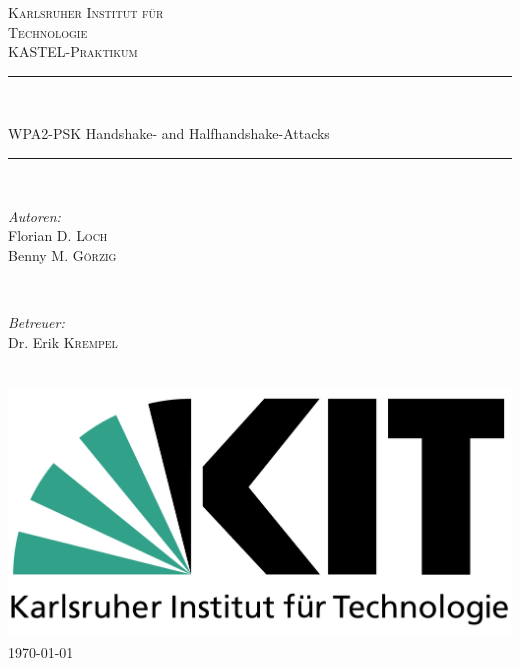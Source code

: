 \begin{titlepage}

\newcommand{\HRule}{\rule{\linewidth}{0.5mm}}

\center

\textsc{\LARGE Karlsruher Institut für }\\[0.5cm]
\textsc{\LARGE Technologie} \\[1.5cm]
\textsc{\Large KASTEL-Praktikum}\\[0.5cm]

\HRule \\[0.4cm]
\begin{huge}
	WPA2-PSK Handshake- and Halfhandshake-Attacks\\[0.4cm] %
\end{huge}
\HRule \\[1.5cm]
 

\begin{minipage}{0.4\textwidth}
\begin{flushleft} \large
\emph{Autoren:}\\
Florian D. \textsc{Loch} \\
Benny M. \textsc{Görzig}
\end{flushleft}
\end{minipage}
~
\begin{minipage}{0.4\textwidth}
\begin{flushright} \large
\emph{Betreuer:} \\
Dr. Erik \textsc{Krempel}
\end{flushright}
\end{minipage}\\[2cm]

\includegraphics[width=\textwidth/3]{logo}\\[1cm] 

{\large \today}\\[1cm]

\vfill 

\end{titlepage}